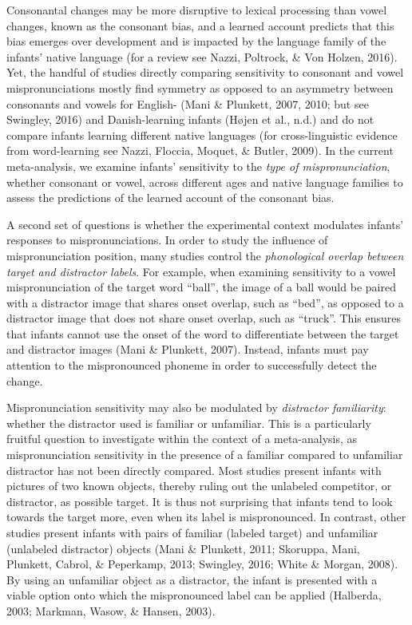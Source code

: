 \documentclass[
  english,
  man, noextraspace]{apa6}
\begin{document}
Consonantal changes may be more disruptive to lexical processing than vowel changes, known as the consonant bias, and a learned account predicts that this bias emerges over development and is impacted by the language family of the infants' native language (for a review see Nazzi, Poltrock, \& Von Holzen, 2016). Yet, the handful of studies directly comparing sensitivity to consonant and vowel mispronunciations mostly find symmetry as opposed to an asymmetry between consonants and vowels for English- (Mani \& Plunkett, 2007, 2010; but see Swingley, 2016) and Danish-learning infants (Højen et al., n.d.) and do not compare infants learning different native languages (for cross-linguistic evidence from word-learning see Nazzi, Floccia, Moquet, \& Butler, 2009). In the current meta-analysis, we examine infants' sensitivity to the \emph{type of mispronunciation}, whether consonant or vowel, across different ages and native language families to assess the predictions of the learned account of the consonant bias.

A second set of questions is whether the experimental context modulates infants' responses to mispronunciations. In order to study the influence of mispronunciation position, many studies control the \emph{phonological overlap between target and distractor labels}. For example, when examining sensitivity to a vowel mispronunciation of the target word ``ball'', the image of a ball would be paired with a distractor image that shares onset overlap, such as ``bed'', as opposed to a distractor image that does not share onset overlap, such as ``truck''. This ensures that infants cannot use the onset of the word to differentiate between the target and distractor images (Mani \& Plunkett, 2007). Instead, infants must pay attention to the mispronounced phoneme in order to successfully detect the change.

Mispronunciation sensitivity may also be modulated by \emph{distractor familiarity}: whether the distractor used is familiar or unfamiliar. This is a particularly fruitful question to investigate within the context of a meta-analysis, as mispronunciation sensitivity in the presence of a familiar compared to unfamiliar distractor has not been directly compared. Most studies present infants with pictures of two known objects, thereby ruling out the unlabeled competitor, or distractor, as possible target. It is thus not surprising that infants tend to look towards the target more, even when its label is mispronounced. In contrast, other studies present infants with pairs of familiar (labeled target) and unfamiliar (unlabeled distractor) objects (Mani \& Plunkett, 2011; Skoruppa, Mani, Plunkett, Cabrol, \& Peperkamp, 2013; Swingley, 2016; White \& Morgan, 2008). By using an unfamiliar object as a distractor, the infant is presented with a viable option onto which the mispronounced label can be applied (Halberda, 2003; Markman, Wasow, \& Hansen, 2003).
\end{document}
